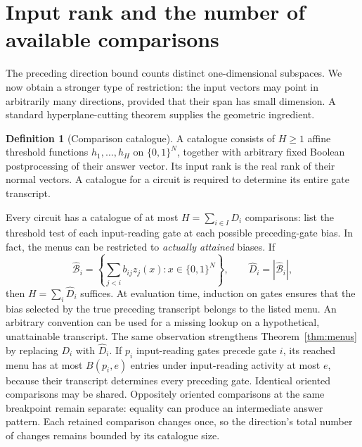\documentclass[11pt]{article}
\theoremstyle{definition}
\newtheorem{definition}[theorem]{Definition}
\newcommand{\bits}{\{0,1\}}
\begin{document}
\section{Input rank and the number of available comparisons}\label{sec:rankcut}
The preceding direction bound counts distinct one-dimensional subspaces. We now obtain a stronger type of restriction: the input vectors may point in arbitrarily many directions, provided that their span has small dimension. A standard hyperplane-cutting theorem supplies the geometric ingredient.

\begin{definition}[Comparison catalogue]
A catalogue consists of \(H\ge1\) affine threshold functions \(h_1,\ldots,h_H\) on \(\bits^N\), together with arbitrary fixed Boolean postprocessing of their answer vector. Its input rank is the real rank of their normal vectors. A catalogue for a circuit is required to determine its entire gate transcript.
\end{definition}

Every circuit has a catalogue of at most \(H=\sum_{i\in I}D_i\) comparisons: list the threshold test of each input-reading gate at each possible preceding-gate bias. In fact, the menus can be restricted to \emph{actually attained} biases. If
\[
 \widehat{\mathcal B}_i
 =\left\{\sum_{j<i}b_{ij}z_j(x):x\in\bits^N\right\},
 \qquad \widehat D_i=|\widehat{\mathcal B}_i|,
\]
then \(H=\sum_i\widehat D_i\) suffices. At evaluation time, induction on gates ensures that the bias selected by the true preceding transcript belongs to the listed menu. An arbitrary convention can be used for a missing lookup on a hypothetical, unattainable transcript. The same observation strengthens Theorem~\ref{thm:menus} by replacing \(D_i\) with \(\widehat D_i\). If \(p_i\) input-reading gates precede gate \(i\), its reached menu has at most \(B(p_i,e)\) entries under input-reading activity at most \(e\), because their transcript determines every preceding gate. Identical oriented comparisons may be shared. Oppositely oriented comparisons at the same breakpoint remain separate: equality can produce an intermediate answer pattern. Each retained comparison changes once, so the direction's total number of changes remains bounded by its catalogue size.
\end{document}
